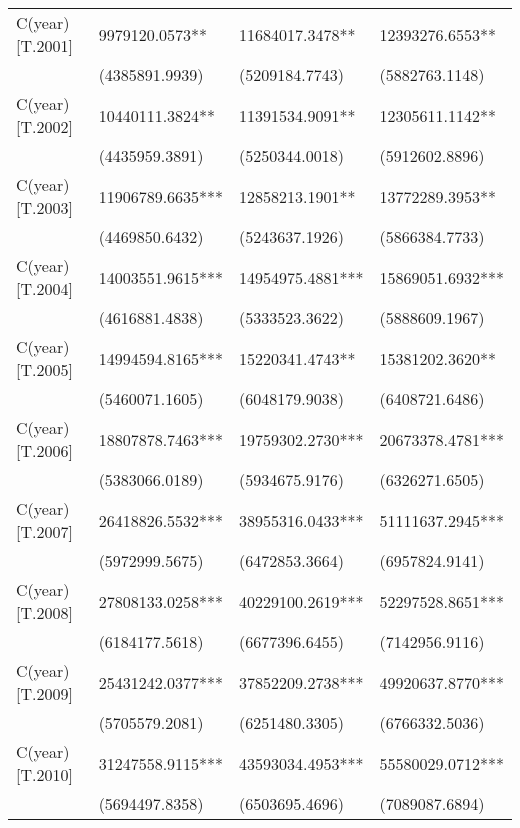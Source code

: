 \begin{table}
\begin{center}
\begin{tabular}{llll}
C(year)[T.2001]          & 9979120.0573**    & 11684017.3478**   & 12393276.6553**     \\
                         & (4385891.9939)    & (5209184.7743)    & (5882763.1148)      \\
C(year)[T.2002]          & 10440111.3824**   & 11391534.9091**   & 12305611.1142**     \\
                         & (4435959.3891)    & (5250344.0018)    & (5912602.8896)      \\
C(year)[T.2003]          & 11906789.6635***  & 12858213.1901**   & 13772289.3953**     \\
                         & (4469850.6432)    & (5243637.1926)    & (5866384.7733)      \\
C(year)[T.2004]          & 14003551.9615***  & 14954975.4881***  & 15869051.6932***    \\
                         & (4616881.4838)    & (5333523.3622)    & (5888609.1967)      \\
C(year)[T.2005]          & 14994594.8165***  & 15220341.4743**   & 15381202.3620**     \\
                         & (5460071.1605)    & (6048179.9038)    & (6408721.6486)      \\
C(year)[T.2006]          & 18807878.7463***  & 19759302.2730***  & 20673378.4781***    \\
                         & (5383066.0189)    & (5934675.9176)    & (6326271.6505)      \\
C(year)[T.2007]          & 26418826.5532***  & 38955316.0433***  & 51111637.2945***    \\
                         & (5972999.5675)    & (6472853.3664)    & (6957824.9141)      \\
C(year)[T.2008]          & 27808133.0258***  & 40229100.2619***  & 52297528.8651***    \\
                         & (6184177.5618)    & (6677396.6455)    & (7142956.9116)      \\
C(year)[T.2009]          & 25431242.0377***  & 37852209.2738***  & 49920637.8770***    \\
                         & (5705579.2081)    & (6251480.3305)    & (6766332.5036)      \\
C(year)[T.2010]          & 31247558.9115***  & 43593034.4953***  & 55580029.0712***    \\
                         & (5694497.8358)    & (6503695.4696)    & (7089087.6894)      \\

\end{tabular}
\end{center}
\end{table}
